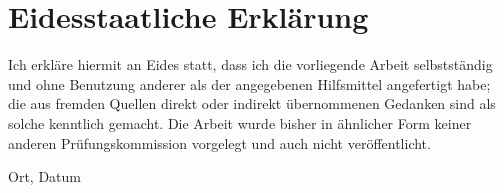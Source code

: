 \chapter*{Eidesstaatliche Erklärung}

Ich erkl\"are hiermit an Eides statt, dass ich die vorliegende Arbeit selbstst\"andig und ohne Benutzung anderer als der angegebenen Hilfsmittel angefertigt habe; die aus fremden Quellen direkt oder indirekt \"ubernommenen Gedanken sind als solche kenntlich gemacht. Die Arbeit wurde bisher in \"ahnlicher Form keiner anderen Pr\"ufungskommission vorgelegt und auch nicht ver\"offentlicht.

\bigskip
\bigskip
\bigskip
\bigskip

   \begin{multicols}{2}
      \raggedright
      Ort, Datum

      \raggedleft
      \authorname

   \end{multicols}
